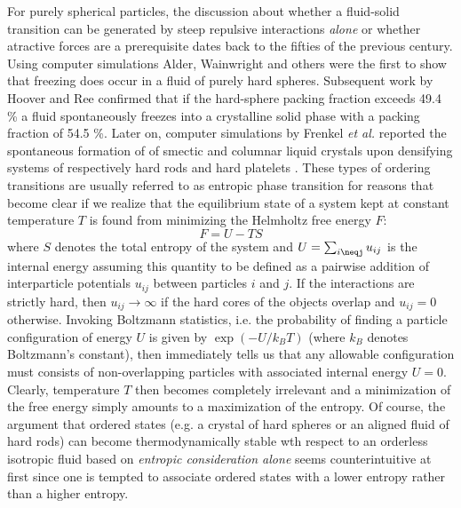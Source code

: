 \documentclass[amssymb]{revtex4}
\begin{document}
For purely spherical particles,  the discussion about whether a fluid-solid transition can be generated by steep repulsive interactions {\em alone}  or whether atractive forces are a prerequisite dates back to the fifties of the previous century. Using computer simulations  Alder, Wainwright and others \cite{ALDER57,WOOD57} were the first to show that freezing does occur in a fluid of purely hard spheres. Subsequent work by
Hoover and Ree \cite{HooverRee} confirmed that if the hard-sphere packing fraction  
exceeds 49.4 \% a fluid  spontaneously freezes into a crystalline 
solid phase with a packing fraction of 54.5 \%.
Later on, computer simulations by Frenkel {\em et al.}  reported the spontaneous formation of
of smectic and columnar liquid crystals upon densifying systems of respectively hard rods \cite{Frenkel88} and 
 hard platelets \cite{frenkellc,Veerman}.  These types of ordering transitions are usually referred to as entropic phase transition for reasons that become clear if we realize that 
 the equilibrium state of a system kept at constant temperature $T$ is found  from minimizing the Helmholtz free energy $F$:
\begin{equation}
F = U -TS
\label{futs}
\end{equation}
where $S$ denotes the total entropy of the system and  $U = \sum_{i \neqj} u_{ij}$ is the internal energy assuming this quantity to be defined as a pairwise addition of interparticle potentials $u_{ij}$ between particles $i$ and $j$.  If the interactions are strictly hard, then $u_{ij} \rightarrow \infty$ if the hard cores of the objects overlap and $u_{ij} = 0$ otherwise. Invoking Boltzmann statistics, i.e. the probability of finding a particle configuration of energy $U$ is given by $\exp( -U/k_{B}T)$ (where $k_{B}$ denotes Boltzmann's constant), then immediately tells us that {\eny any}  allowable configuration must consists of non-overlapping particles with associated internal energy $U=0$. Clearly, temperature $T$ then becomes completely irrelevant and a minimization of the free energy simply amounts to a maximization of the entropy.  
Of course, the argument that ordered states (e.g. a crystal of hard spheres or an aligned fluid of hard rods) can become thermodynamically stable wth respect to an orderless isotropic fluid based on {\em entropic consideration alone} seems counterintuitive at first since one is tempted to associate ordered states with a lower entropy rather than a higher entropy.  
\end{document}
